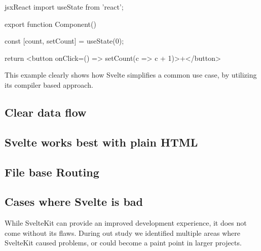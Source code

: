 \begin{myminted}{jsx}{React}
import { useState } from 'react';

export function Component() {
    const [count, setCount] = useState(0);

    return <button onClick={() => setCount(c => c + 1)}>+</button>
}  
\end{myminted}

This example clearly shows how Svelte simplifies a common use case, by utilizing its compiler based approach.  

\subsection{Clear data flow}

\subsection{Svelte works best with plain HTML}

\subsection{File base Routing}

\subsection{Cases where Svelte is bad}


While SvelteKit can provide an improved development experience, it does not come without its flaws. During out study we identified multiple areas where SvelteKit caused problems, or could become a paint point in larger projects.

